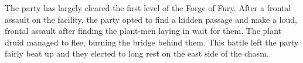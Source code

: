 The party has largely cleared the first level of the Forge of Fury.
After a frontal assault on the facility, the party opted to find a hidden passage and make a loud, frontal assault after finding the plant-men laying in wait for them.
The plant druid managed to flee, burning the bridge behind them.
This battle left the party fairly beat up and they elected to long rest on the east side of the chasm.
